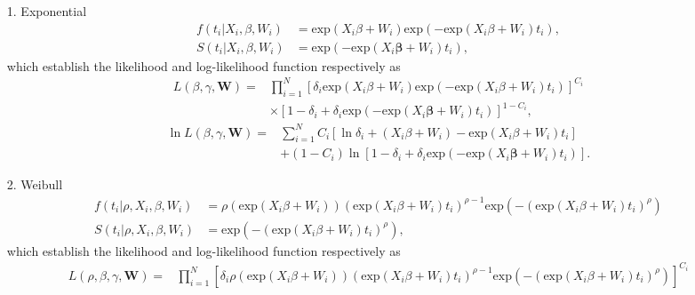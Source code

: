 \documentclass[a4paper, 12pt]{article}
\newcommand {\dsum}{\displaystyle \sum}
\newcommand {\dprod}{\displaystyle \prod}
\begin{document}
\begin{itemize}
	\item [1.] Exponential
	\begin{equation}
	\begin{aligned}
	f(t_i|X_i, {\beta}, W_i) &= \mbox{exp}(X_i{\beta}+ W_i)\mbox{exp}(- \mbox{exp}(X_i{\beta}+ W_i)t_i),\\
	S(t_i|X_i, {\beta},  W_i) &= \mbox{exp}(- \mbox{exp}(X_i\mathbf{\beta}+ W_i)t_i),
	\end{aligned}
	\end{equation}
which establish the likelihood and log-likelihood function respectively as
	\begin{equation}
	\begin{aligned}
	L({\beta}, {\gamma}, \mathbf{W})=&\dprod\limits_{i=1}^{N}[\delta _{i}\mbox{exp}(X_i{\beta}+ W_i)\mbox{exp}(- \mbox{exp}(X_i{\beta}+ W_i)t_i)]^{C_i}\\
	&\times [1-\delta _{i}+\delta_i  \mbox{exp}(- \mbox{exp}(X_i\mathbf{\beta}+ W_i)t_i)]^{1-C_{i}},
	\end{aligned}
	\end{equation}
		\begin{equation}
		\begin{aligned}
		\ln L({\beta}, {\gamma}, \mathbf{W})=&\dsum\limits_{i=1}^{N}C_i [\ln\delta _{i}+(X_i{\beta}+ W_i)- \mbox{exp}(X_i{\beta}+ W_i)t_i]\\&+(1-C_i)\ln[1-\delta _{i}+\delta_i  \mbox{exp}(- \mbox{exp}(X_i\mathbf{\beta}+ W_i)t_i)].		
		\end{aligned}
		\end{equation}
	\item [2.] Weibull
	\begin{equation}
	\begin{aligned}
f(t_i|\rho, X_i, {\beta}, W_i) &= \rho(\mbox{exp}(X_i{\beta}+W_i)) (\mbox{exp}(X_i{\beta}+W_i)t_i)^{\rho - 1} \mbox{exp}(-(\mbox{exp}(X_i{\beta}+W_i)t_i)^{\rho})\\
S(t_i|\rho, X_i, {\beta}, W_i) &= \mbox{exp}(-(\mbox{exp}(X_i{\beta}+W_i)t_i)^{\rho}),
	\end{aligned}
	\end{equation}
	which establish the likelihood and log-likelihood function respectively as
	\begin{equation}
	\begin{aligned}
	L(\rho, {\beta}, {\gamma}, \mathbf{W})=&\dprod\limits_{i=1}^{N}[\delta _{i}\rho(\mbox{exp}(X_i{\beta}+W_i)) (\mbox{exp}(X_i{\beta}+W_i)t_i)^{\rho - 1} \mbox{exp}(-(\mbox{exp}(X_i{\beta}+W_i)t_i)^{\rho})]^{C_i}\\

\end{aligned}
\end{equation}
\end{itemize}
\end{document}

